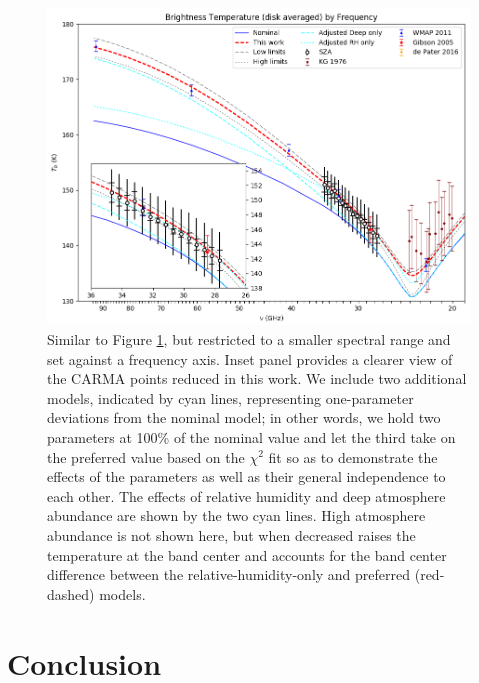 \documentclass{article}
\begin{document}
	\begin{figure}
		\centering
		\includegraphics[width=\textwidth]{final_models_freq.png}
		\caption{\label{fig:emission_freq}Similar to Figure \ref{fig:emission_freq}, but restricted to a smaller spectral range and set against a frequency axis. Inset panel provides a clearer view of the CARMA points reduced in this work. We include two additional models, indicated by cyan lines, representing one-parameter deviations from the nominal model; in other words, we hold two parameters at 100\% of the nominal value and let the third take on the preferred value based on the $\chi^{2}$ fit so as to demonstrate the effects of the parameters as well as their general independence to each other. The effects of relative humidity and deep atmosphere abundance are shown by the two cyan lines. High atmosphere abundance is not shown here, but when decreased raises the temperature at the band center and accounts for the band center difference between the relative-humidity-only and preferred (red-dashed) models.}
	\end{figure}


\section{Conclusion}
\end{document}
